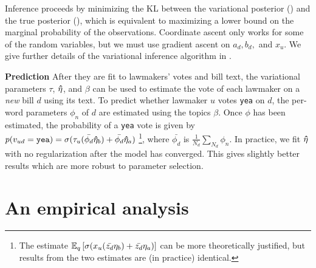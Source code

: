 Inference proceeds by minimizing the KL between the variational
posterior () and the true posterior (),
which is equivalent to maximizing a lower bound on the marginal
probability of the observations.  Coordinate ascent only works for
some of the random variables, but we must use gradient ascent on $a_d,
b_d,$ and $x_u$.  We give further details of the variational inference
algorithm in .

\textbf{Prediction} After they are fit to lawmakers' votes and bill
text, the variational parameters $\tau$, $\bm \hat \eta$, and $\beta$ can be
used to estimate the vote of each lawmaker on a \emph{new} bill $d$
using its text.  To predict whether lawmaker $u$ votes \verb!yea! on
$d$, the per-word parameters $\phi_n$ of $d$ are estimated using the
topics $\beta$. Once $\phi$ has been estimated, the probability of a
\verb!yea! vote is given by $p(v_{ud} = \verb!yea!)  = \sigma(\tau_u
(\bar{\phi_d} \ev_b) + \bar{\phi_d} \ev_a)$
\footnote{The estimate $\mathbb{E}_q\left[\sigma(x_u (\bar{z_d} \eta_b) +
    \bar{z_d} \eta_a)\right]$ can be more theoretically justified, but
  results from the two estimates are (in practice) identical.}, where
$\bar{\phi_d}$ is $\frac{1}{N_d} \sum_{N_d} \phi_n$.  In practice, we
fit $\bm \hat \eta$ with no regularization after the model has converged.  This
gives slightly better results which are more robust to parameter
selection.

\section{An empirical analysis}

